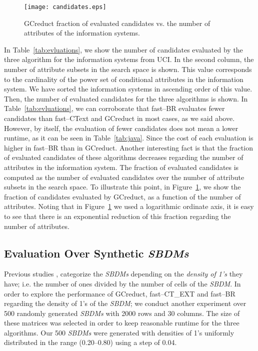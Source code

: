\documentclass[number,preprint,review,12pt]{elsarticle}
\begin{document}
	\begin{figure}[htb]
		\begin{center}
			\texttt{[image: candidates.eps]}
		\end{center}
		\caption{GCreduct fraction of evaluated candidates vs. the number of attributes of the information systems.}
		\label{fig:candidates}
	\end{figure}	

	In Table~\ref{tab:evluations}, we show the number of candidates evaluated by the three algorithm for the information systems from UCI. In the second column, the number of attribute subsets in the search space is shown. This value corresponds to the cardinality of the power set of conditional attributes in the information system. We have sorted the information systems in ascending order of this value. Then, the number of evaluated candidates for the three algorithms is shown. In Table~\ref{tab:evluations}, we can corroborate that fast--BR evaluates fewer candidates than fast--CText and GCreduct in most cases, as we said above. However, by itself, the evaluation of fewer candidates does not mean a lower runtime, as it can be seen in Table~\ref{tab:java}. Since the cost of each evaluation is higher in fast--BR than in GCreduct. Another interesting fact is that the fraction of evaluated candidates of these algorithms decreases regarding the number of attributes in the information system. The fraction of evaluated candidates is computed as the number of evaluated candidates over the number of attribute subsets in the search space. To illustrate this point, in Figure~\ref{fig:candidates}, we show the fraction of candidates evaluated by GCreduct, as a function of the number of attributes. Noting that in Figure~\ref{fig:candidates} we used a logarithmic ordinate axis, it is easy to see that there is an exponential reduction of this fraction regarding the number of attributes. \label{par:brutal}
		
		
\subsection{Evaluation Over Synthetic \textit{SBDMs}}\label{sub:synth}

	Previous studies \citep{Rojas12,Lias13,Rodriguez15}, categorize the \textit{SBDMs} depending on the \emph{density of 1's} they have; i.e. the number of ones divided by the number of cells of the \textit{SBDM}. In order to explore the performance of GCreduct, fast--CT\_EXT and fast--BR regarding the density of 1's of the \textit{SBDM}; we conduct another experiment over 500 randomly generated \textit{SBDMs} with 2000 rows and 30 columns. The size of these matrices was selected in order to keep reasonable runtime for the three algorithms. Our 500 \textit{SBDMs} were generated with densities of 1's uniformly distributed in the range (0.20--0.80) using a step of 0.04. 
				
\end{document}
